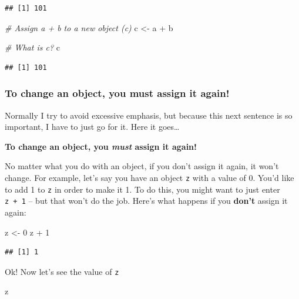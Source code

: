 \documentclass[
]{book}
\newenvironment{Shaded}{\begin{snugshade}}{\end{snugshade}}
\newcommand{\CommentTok}[1]{\textcolor[rgb]{0.56,0.35,0.01}{\textit{#1}}}
\newcommand{\DecValTok}[1]{\textcolor[rgb]{0.00,0.00,0.81}{#1}}
\newcommand{\NormalTok}[1]{#1}
\newcommand{\OtherTok}[1]{\textcolor[rgb]{0.56,0.35,0.01}{#1}}
\newcommand{\SpecialCharTok}[1]{\textcolor[rgb]{0.00,0.00,0.00}{#1}}
\begin{document}
\begin{verbatim}
## [1] 101
\end{verbatim}

\begin{Shaded}
\begin{Highlighting}[]
\CommentTok{\# Assign a + b to a new object (c)}
\NormalTok{c }\OtherTok{\textless{}{-}}\NormalTok{ a }\SpecialCharTok{+}\NormalTok{ b}

\CommentTok{\# What is c?}
\NormalTok{c}
\end{Highlighting}
\end{Shaded}

\begin{verbatim}
## [1] 101
\end{verbatim}

\hypertarget{to-change-an-object-you-must-assign-it-again}{%
\subsubsection{To change an object, you must assign it again!}\label{to-change-an-object-you-must-assign-it-again}}

Normally I try to avoid excessive emphasis, but because this next sentence is so important, I have to just go for it. Here it goes\ldots{}

\textbf{To change an object, you \textit{must} assign it again!}

No matter what you do with an object, if you don't assign it again, it won't change. For example, let's say you have an object \texttt{z} with a value of 0. You'd like to add 1 to \texttt{z} in order to make it 1. To do this, you might want to just enter \texttt{z\ +\ 1} -- but that won't do the job. Here's what happens if you \textbf{don't} assign it again:

\begin{Shaded}
\begin{Highlighting}[]
\NormalTok{z }\OtherTok{\textless{}{-}} \DecValTok{0}
\NormalTok{z }\SpecialCharTok{+} \DecValTok{1}
\end{Highlighting}
\end{Shaded}

\begin{verbatim}
## [1] 1
\end{verbatim}

Ok! Now let's see the value of \texttt{z}

\begin{Shaded}
\begin{Highlighting}[]
\NormalTok{z}
\end{Highlighting}
\end{Shaded}
\end{document}
